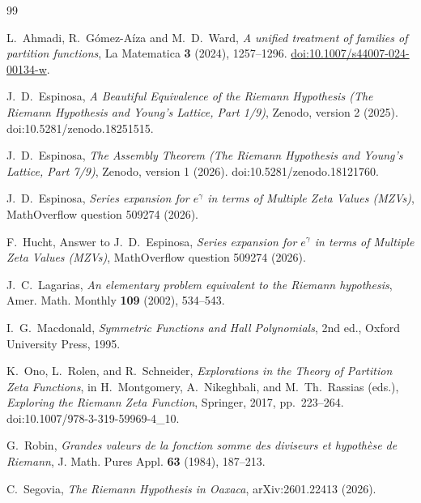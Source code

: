 \documentclass[11pt]{article}
\theoremstyle{definition}
\begin{document}
\begin{thebibliography}{99}

L.~Ahmadi, R.~G\'omez-A\'iza and M.~D.~Ward,
\emph{A unified treatment of families of partition functions},
La Matematica \textbf{3} (2024), 1257--1296.
\href{https://doi.org/10.1007/s44007-024-00134-w}
{doi:10.1007/s44007-024-00134-w}.

J.~D.~Espinosa,
\emph{A Beautiful Equivalence of the Riemann Hypothesis
(The Riemann Hypothesis and Young's Lattice, Part 1/9)},
Zenodo, version 2 (2025).
doi:10.5281/zenodo.18251515.

J.~D.~Espinosa,
\emph{The Assembly Theorem
(The Riemann Hypothesis and Young's Lattice, Part 7/9)},
Zenodo, version 1 (2026).
doi:10.5281/zenodo.18121760.

J.~D.~Espinosa,
\emph{Series expansion for $e^\gamma$ in terms of Multiple Zeta
Values (MZVs)},
MathOverflow question 509274 (2026).

F.~Hucht,
Answer to J.~D.~Espinosa,
\emph{Series expansion for $e^\gamma$ in terms of Multiple Zeta
Values (MZVs)},
MathOverflow question 509274 (2026).

J.~C.~Lagarias,
\emph{An elementary problem equivalent to the Riemann hypothesis},
Amer. Math. Monthly \textbf{109} (2002), 534--543.

I.~G.~Macdonald,
\emph{Symmetric Functions and Hall Polynomials},
2nd ed., Oxford University Press, 1995.

K.~Ono, L.~Rolen, and R.~Schneider,
\emph{Explorations in the Theory of Partition Zeta Functions},
in H.~Montgomery, A.~Nikeghbali, and M.~Th.~Rassias (eds.),
\emph{Exploring the Riemann Zeta Function},
Springer, 2017, pp.~223--264.
doi:10.1007/978-3-319-59969-4\_10.

G.~Robin,
\emph{Grandes valeurs de la fonction somme des diviseurs et hypoth\`ese de Riemann},
J. Math. Pures Appl. \textbf{63} (1984), 187--213.

C.~Segovia,
\emph{The Riemann Hypothesis in Oaxaca},
arXiv:2601.22413 (2026).

\end{thebibliography}
\end{document}
